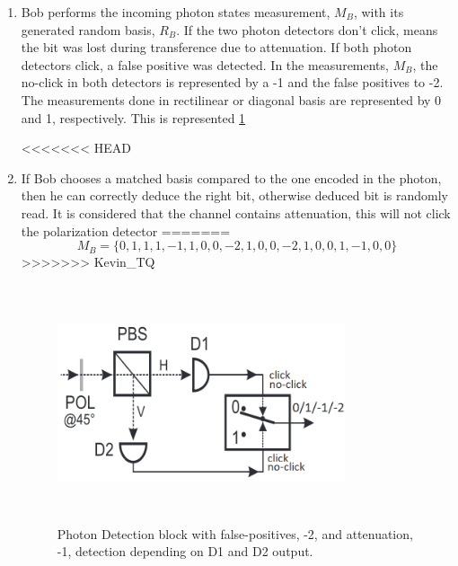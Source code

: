 \begin{enumerate}
	\item Bob performs the incoming photon states measurement, $M_{B}$, with its generated random basis, $R_{B}$. If the two photon detectors don't click, means the bit was lost during transference due to attenuation. If both photon detectors click, a false positive was detected. In the measurements, $M_{B}$, the no-click in both detectors is represented by a -1 and the false positives to -2. The measurements done in rectilinear or diagonal basis are represented by 0 and 1, respectively. This is represented \ref{fig:bb84 detector}
	
<<<<<<< HEAD
	\item If Bob chooses a matched basis compared to the one encoded in the photon, then he can correctly deduce the right bit, otherwise deduced bit is randomly read. It is considered that the channel contains attenuation, this will not click the polarization detector
=======
	$$M_{B} = \{0,1,1,1,-1,1,0,0,-2,1,0,0,-2,1,0,0,1,-1,0,0\}$$	
>>>>>>> Kevin_TQ
	
	\begin{figure}[H]
		\centering
		\includegraphics[width=0.8\textwidth,height=7cm]{./sdf/bb84_with_discrete_variables/figures/detector.png}
		\caption{Photon Detection block with false-positives, -2, and attenuation, -1, detection depending on D1 and D2 output.\label{fig:bb84 detector}}
	\end{figure}
	
\end{enumerate}

